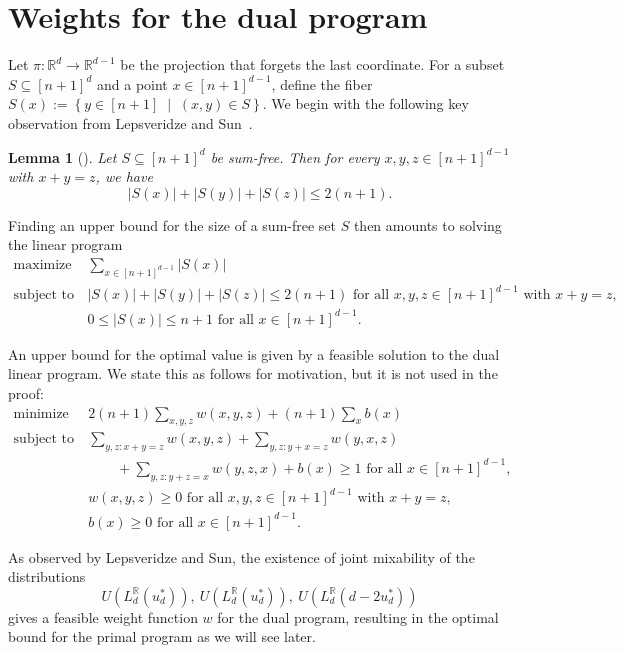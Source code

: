 \documentclass{article}
\newcommand{\setcond}[2]{\left\{ #1 \;\middle\vert\; #2 \right\}}
\newcommand{\RR}{\mathbb{R}}
\newtheorem{lem}[thm]{Lemma}
\theoremstyle{definition}
\begin{document}
\section{Weights for the dual program}

Let $\pi:\RR^d\to \RR^{d-1}$ be the projection that forgets the last coordinate. For a subset $S\subseteq [n+1]^d$ and a point $x\in [n+1]^{d-1}$, define the fiber $S(x) := \setcond{y\in [n+1]}{(x,y)\in S}$. We begin with the following key observation from Lepsveridze and Sun~\cite{LS23}.

\begin{lem}[{\cite[Lemma~2.3]{LS23}}] \label{lem:fiber-bound}
    Let $S\subseteq [n+1]^d$ be sum-free. Then for every $x,y,z\in [n+1]^{d-1}$ with $x+y=z$, we have
    \begin{equation} \label{eq:fiber-bound}
        |S(x)|+|S(y)|+|S(z)|\leq 2(n+1).
    \end{equation}
\end{lem}

Finding an upper bound for the size of a sum-free set $S$ then amounts to solving the linear program
\begin{align*}
    \text{maximize } & \sum_{x\in [n+1]^{d-1}} |S(x)| \\
    \text{subject to } & |S(x)|+|S(y)|+|S(z)|\leq 2(n+1) \text{ for all } x,y,z\in [n+1]^{d-1} \text{ with } x+y=z, \\
    & 0\leq |S(x)|\leq n+1 \text{ for all } x\in [n+1]^{d-1}.
\end{align*}

An upper bound for the optimal value is given by a feasible solution to the dual linear program. We state this as follows for motivation, but it is not used in the proof: 
\begin{align*}
    \text{minimize } & 2(n+1) \sum_{x,y,z} w(x,y,z) + (n+1) \sum_x b(x) \\
    \text{subject to } & \sum_{y,z: x+y=z} w(x,y,z) + \sum_{y,z: y+x=z} w(y,x,z) \\
    & \qquad + \sum_{y,z: y+z=x} w(y,z,x) + b(x) \geq 1 \text{ for all } x\in [n+1]^{d-1}, \\
    & w(x,y,z)\geq 0 \text{ for all } x,y,z\in [n+1]^{d-1} \text{ with } x+y=z, \\
    & b(x)\geq 0 \text{ for all } x\in [n+1]^{d-1}.
\end{align*}

As observed by Lepsveridze and Sun, the existence of joint mixability of the distributions 
\[U(L_{d}^\RR(u_d^*)),\ U(L_{d}^\RR(u_d^*)),\ U(L_{d}^\RR(d-2u_d^*))\]
gives a feasible weight function $w$ for the dual program, resulting in the optimal bound for the primal program as we will see later. 
\end{document}
